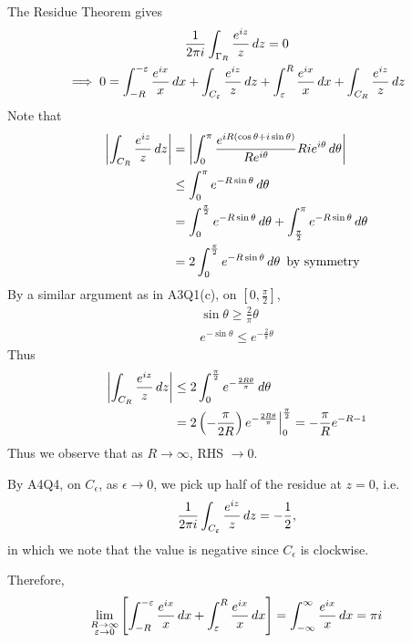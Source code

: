\documentclass[notoc,notitlepage]{tufte-book}
\begin{document}
\begin{ex}
  The Residue Theorem gives
  \begin{gather*}
    \frac{1}{2 \pi i} \int_{\Gamma_R} \frac{e^{iz}}{z} \mathop{}\!d{z} = 0 \\
    \implies 0 = \int_{-R}^{-\varepsilon} \frac{e^{ix}}{x} \mathop{}\!d{x} + \int_{C_\varepsilon} \frac{e^{iz}}{z} \mathop{}\!d{z} + \int_{\varepsilon}^{R} \frac{e^{ix}}{x} \mathop{}\!d{x} + \int_{C_R} \frac{e^{iz}}{z} \mathop{}\!d{z} 
  \end{gather*}
  Note that
  \begin{align*}
    \left|\int_{C_R} \frac{e^{iz}}{z} \mathop{}\!d{z} \right|
      &= \left|\int_{0}^{\pi} \frac{e^{iR(\cos \theta + i \sin \theta)}}{Re^{i \theta}} Rie^{i \theta} \mathop{}\!d{\theta} \right| \\
      &\leq \int_{0}^{\pi} e^{-R \sin \theta} \mathop{}\!d{\theta}  \\
      &= \int_{0}^{\frac{\pi}{2}} e^{-R \sin \theta} \mathop{}\!d{\theta} + \int_{\frac{\pi}{2}}^{\pi} e^{-R \sin \theta} \mathop{}\!d{\theta} \\
      &= 2 \int_{0}^{\frac{\pi}{2}} e^{-R \sin \theta} \mathop{}\!d{\theta} \enspace \text{by symmetry} 
  \end{align*}
  By a similar argument as in A3Q1(c), on $[0, \frac{\pi}{2} ]$,
  \begin{gather*}
    \sin \theta \geq \frac{2}{\pi} \theta \\
    e^{- \sin \theta} \leq e^{- \frac{2}{\pi} \theta}
  \end{gather*}
  Thus
  \begin{align*}
    \left|\int_{C_R} \frac{e^{iz}}{z} \mathop{}\!d{z} \right|
      &\leq 2 \int_{0}^{\frac{\pi}{2}} e^{-\frac{2R \theta}{\pi}} \mathop{}\!d{\theta} \\
      &= 2 \left( -\frac{\pi}{2R} \right) e^{-\frac{2R \theta}{\pi} }\Big|_{0}^{\frac{\pi}{2}} = -\frac{\pi}{R} e^{-R - 1}
  \end{align*}
  Thus we observe that as $R \to \infty$, RHS $\to 0$.

  By A4Q4, on $C_\epsilon$, as $\epsilon \to 0$, we pick up half of the residue at $z = 0$, i.e.
  \begin{equation*}
    \frac{1}{2 \pi i} \int_{C_\varepsilon} \frac{e^{iz}}{z} \mathop{}\!d{z} = - \frac{1}{2},
  \end{equation*}
  in which we note that the value is negative since $C_\epsilon$ is clockwise.

  Therefore,
  \begin{equation*}
    \lim_{\substack{R \to \infty \\ \varepsilon \to 0}} \left[ \int_{-R}^{-\varepsilon} \frac{e^{ix}}{x} \mathop{}\!d{x} + \int_{\varepsilon}^{R} \frac{e^{ix}}{x} \mathop{}\!d{x} \right] = \int_{-\infty}^{\infty} \frac{e^{ix}}{x} \mathop{}\!d{x} = \pi i
  \end{equation*}


\end{ex}
\end{document}
